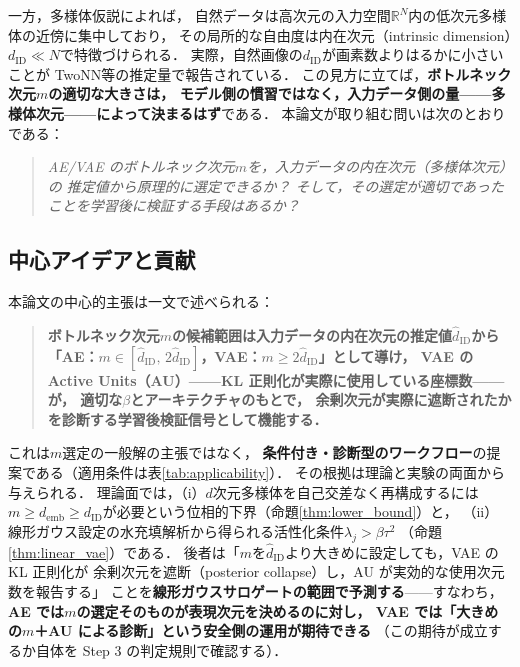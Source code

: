\documentclass[11pt,a4paper]{jsarticle}
\newcommand{\dID}{d_{\mathrm{ID}}}
\newcommand{\hatdID}{\hat{d}_{\mathrm{ID}}}
\newcommand{\R}{\mathbb{R}}
\newcommand{\demb}{d_{\mathrm{emb}}}
\begin{document}
一方，多様体仮説\cite{fefferman2016manifold}によれば，
自然データは高次元の入力空間$\R^N$内の低次元多様体の近傍に集中しており，
その局所的な自由度は内在次元（intrinsic dimension）$\dID \ll N$で特徴づけられる．
実際，自然画像の$\dID$が画素数よりはるかに小さいことが
TwoNN\cite{facco2017twonn}等の推定量で報告されている\cite{pope2021intrinsic}．
この見方に立てば，\textbf{ボトルネック次元$m$の適切な大きさは，
モデル側の慣習ではなく，入力データ側の量——多様体次元——によって決まるはず}である．
本論文が取り組む問いは次のとおりである：
\begin{quote}
\textit{AE/VAE のボトルネック次元$m$を，入力データの内在次元（多様体次元）の
推定値から原理的に選定できるか？
そして，その選定が適切であったことを学習後に検証する手段はあるか？}
\end{quote}

\subsection{中心アイデアと貢献}\label{sec:intro_aim}

本論文の中心的主張は一文で述べられる：
\begin{quote}
\textbf{ボトルネック次元$m$の候補範囲は入力データの内在次元の推定値$\hatdID$から
「AE：$m \in [\hatdID,\, 2\hatdID]$，VAE：$m \geq 2\hatdID$」として導け，
VAE の Active Units（AU）——KL 正則化が実際に使用している座標数——が，
適切な$\beta$とアーキテクチャのもとで，
余剰次元が実際に遮断されたかを診断する学習後検証信号として機能する．}
\end{quote}
これは$m$選定の一般解の主張ではなく，
\textbf{条件付き・診断型のワークフロー}の提案である（適用条件は表\ref{tab:applicability}）．
その根拠は理論と実験の両面から与えられる．
理論面では，（i）$d$次元多様体を自己交差なく再構成するには
$m \geq \demb \geq \dID$が必要という位相的下界（命題\ref{thm:lower_bound}）と，
（ii）線形ガウス設定の水充填解析から得られる活性化条件$\lambda_j > \beta\tau^2$
（命題\ref{thm:linear_vae}）である．
後者は「$m$を$\hatdID$より大きめに設定しても，VAE の KL 正則化が
余剰次元を遮断（posterior collapse）し，AU が実効的な使用次元数を報告する」
ことを\textbf{線形ガウスサロゲートの範囲で予測する}——すなわち，
\textbf{AE では$m$の選定そのものが表現次元を決めるのに対し，
VAE では「大きめの$m$＋AU による診断」という安全側の運用が期待できる}
（この期待が成立するか自体を Step 3 の判定規則で確認する）．
\end{document}
